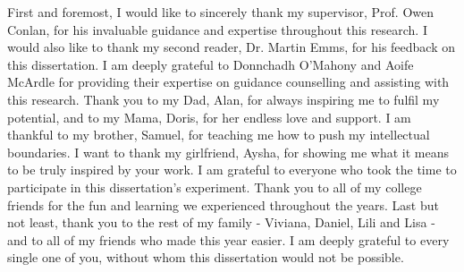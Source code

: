 \documentclass[a4paper, 12pt, oneside]{report}         %
\begin{document}
\begin{thesisacknowledgments}                     %
  First and foremost, I would like to sincerely thank my supervisor, Prof. Owen Conlan, for his invaluable guidance and expertise throughout this research.
  I would also like to thank my second reader, Dr. Martin Emms, for his feedback on this dissertation.
  I am deeply grateful to Donnchadh O'Mahony and Aoife McArdle for providing their expertise on guidance counselling and assisting with this research.
  Thank you to my Dad, Alan, for always inspiring me to fulfil my potential,
  and to my Mama, Doris, for her endless love and support.
  I am thankful to my brother, Samuel, for teaching me how to push my intellectual boundaries.
  I want to thank my girlfriend, Aysha, for showing me what it means to be truly inspired by your work.
  I am grateful to everyone who took the time to participate in this dissertation's experiment.
  Thank you to all of my college friends for the fun and learning we experienced throughout the years.
  Last but not least, thank you to the rest of my family - Viviana, Daniel, Lili and Lisa - 
  and to all of my friends who made this year easier.
  I am deeply grateful to every single one of you, without whom this dissertation would not be possible.
\end{thesisacknowledgments}                       %
  
  
\tableofcontents                                  %
\listoftables                                     %
\listoffigures                                    %













\appendix

\end{document}
